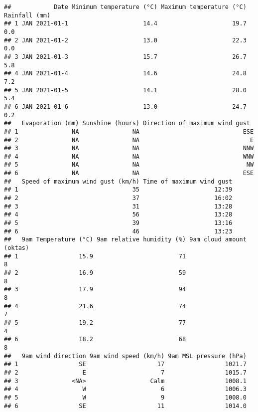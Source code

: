 \documentclass[
]{article}
\begin{document}
\begin{verbatim}
##            Date Minimum temperature (°C) Maximum temperature (°C) Rainfall (mm)
## 1 JAN 2021-01-1                     14.4                     19.7           0.0
## 2 JAN 2021-01-2                     13.0                     22.3           0.0
## 3 JAN 2021-01-3                     15.7                     26.7           5.8
## 4 JAN 2021-01-4                     14.6                     24.8           7.2
## 5 JAN 2021-01-5                     14.1                     28.0           5.4
## 6 JAN 2021-01-6                     13.0                     24.7           0.2
##   Evaporation (mm) Sunshine (hours) Direction of maximum wind gust 
## 1               NA               NA                             ESE
## 2               NA               NA                               E
## 3               NA               NA                             NNW
## 4               NA               NA                             WNW
## 5               NA               NA                              NW
## 6               NA               NA                             ESE
##   Speed of maximum wind gust (km/h) Time of maximum wind gust
## 1                                35                     12:39
## 2                                37                     16:02
## 3                                31                     13:28
## 4                                56                     13:28
## 5                                39                     13:16
## 6                                46                     13:23
##   9am Temperature (°C) 9am relative humidity (%) 9am cloud amount (oktas)
## 1                 15.9                        71                        8
## 2                 16.9                        59                        8
## 3                 17.9                        94                        8
## 4                 21.6                        74                        7
## 5                 19.2                        77                        4
## 6                 18.2                        68                        8
##   9am wind direction 9am wind speed (km/h) 9am MSL pressure (hPa)
## 1                 SE                    17                 1021.7
## 2                  E                     7                 1015.7
## 3               <NA>                  Calm                 1008.1
## 4                  W                     6                 1006.3
## 5                  W                     9                 1008.0
## 6                 SE                    11                 1014.0

\end{verbatim}
\end{document}
